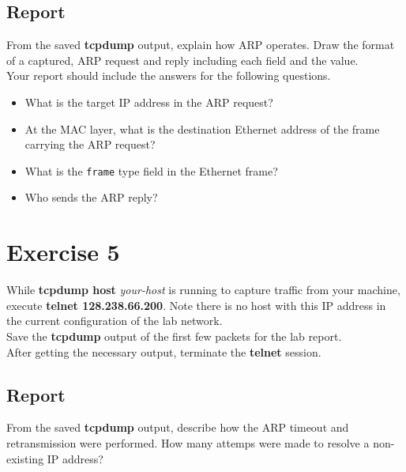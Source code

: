 \documentclass[10pt,a4paper]{article}
\numberwithin{equation}{section}
\numberwithin{figure}{section}
\numberwithin{table}{section}
\begin{document}
    \subsection*{Report}
    From the saved \textbf{tcpdump} output, explain how ARP operates.
    Draw the format of a captured, ARP request and reply including each field and the value. \\
    Your report should include the answers for the following questions.
    \begin{itemize}
        \item What is the target IP address in the ARP request?
        \item At the MAC layer, what is the destination Ethernet address of the frame carrying the ARP request?
        \item What is the \texttt{frame} type field in the Ethernet frame?
        \item Who sends the ARP reply?
    \end{itemize}

    \section{ Exercise 5}
    While \textbf{tcpdump host} \textit{your-host} is running to capture traffic from your machine, execute \textbf{telnet 128.238.66.200}.
    Note there is no host with this IP address in the current configuration of the lab network. \\
    Save the \textbf{tcpdump} output of the first few packets for the lab report. \\
    After getting the necessary output, terminate the \textbf{telnet} session.
    \subsection*{Report}
    From the saved \textbf{tcpdump} output, describe how the ARP timeout and retransmission were performed.
    How many attemps were made to resolve a non-existing IP address?
\end{document}

